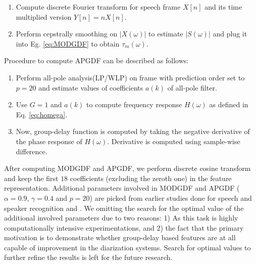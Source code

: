\documentclass[conference]{IEEEtran}
\begin{document}
\begin{enumerate}
\item Compute discrete Fourier transform for speech frame $X[n]$ and its time
multiplied version $Y[n]=nX[n]$.
\item Perform cepstrally smoothing on $|X(\omega)|$ to estimate $|S(\omega)|$
and plug it into Eg. \ref{eq:MODGDF} to obtain $\tau_{m}(\omega)$.
\end{enumerate}	
\vspace{0.2cm}
Procedure to compute APGDF can be described as follows:
\begin{enumerate}
\item Perform all-pole analysis(LP/WLP) on frame with prediction order set to
$p=20$ and estimate values of coefficients $a(k)$ of all-pole filter.  
\item Use $G=1$ and $a(k)$ to compute frequency response $H(\omega)$ as defined
in Eq. \ref{eq:homega}.
\item Now, group-delay function is computed by taking the negative derivative of
the phase response of $H(\omega)$. Derivative is computed using sample-wise
difference.
\end{enumerate}	
\vspace{0.2cm}
After computing MODGDF and APGDF, we perform discrete cosine transform and keep
the first $18$ coefficients (excluding the zeroth one) in the feature
representation. Additional parameters involved in MODGDF and APGDF ($\alpha =
0.9$, $\gamma=0.4$ and $p=20$) are picked from earlier studies done for speech
and speaker recognition \cite{modifiedGD} and \cite{allPoleGdSid}. We omitting
the search for the optimal value of the additional involved parameters due to
two reasons: 1) As this task is highly computationally intensive
experimentations, and 2) the fact that the primary motivation is to demonstrate
whether group-delay based features are at all capable of improvement in the
diarization systems. Search for optimal values to further refine the results is
left for the future research.
\end{document}

